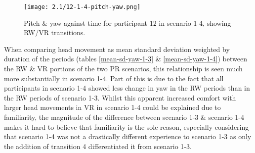 \begin{figure}[h]
	\begin{center}
	\texttt{[image: 2.1/12-1-4-pitch-yaw.png]}
	\caption{Pitch \& yaw against time for participant 12 in scenario 1-4, showing RW/VR transitions.}
	\label{12-1-4-pitch-yaw.png}
	\end{center}
\end{figure}

When comparing head movement as mean standard deviation weighted by duration of the periods (tables \ref{mean-sd-yaw-1-3} \& \ref{mean-sd-yaw-1-4}) between the RW \& VR portions of the two PR scenarios, this relationship is seen much more substantially in scenario 1-4. Part of this is due to the fact that all participants in scenario 1-4 showed less change in yaw in the RW periods than in the RW periods of scenario 1-3. Whilst this apparent increased comfort with larger head movements in VR in scenario 1-4 could be explained due to familiarity, the magnitude of the difference between scenario 1-3 \& scenario 1-4 makes it hard to believe that familiarity is the sole reason, especially considering that scenario 1-4 was not a drastically different experience to scenario 1-3 as only the addition of transition 4 differentiated it from scenario 1-3.

